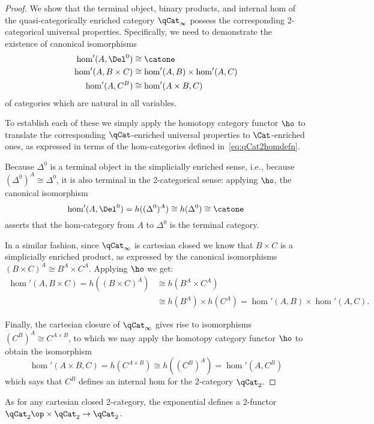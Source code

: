 \begin{proof}
We show that the terminal object, binary products, and internal hom of the quasi-categorically enriched category $\qCat_\infty$ possess the corresponding 2-categorical universal properties. Specifically, we need to demonstrate the existence of canonical isomorphisms
\begin{align*}
  \hom'(A, \Del^0) &\cong \catone \\
  \hom'(A, B\times C) &\cong \hom'(A, B)\times\hom'(A,C) \\
  \hom'(A, C^B) &\cong \hom'(A\times B, C)
\end{align*}
of categories which are natural in all variables.

To establish each of these we simply apply the homotopy category functor $\ho$ to translate the corresponding $\qCat$-enriched universal properties to $\Cat$-enriched ones, as expressed in terms of the hom-categories defined in~\eqref{eq:qCat2homdefn}. 

Because $\Delta^0$ is a terminal object in the simplicially enriched sense, i.e., because $(\Delta^0)^A \cong \Delta^0$, it is also terminal in the 2-categorical sense: applying $\ho$, the canonical isomorphism
  \[
    \hom'(A,\Del^0) = h( (\Delta^0)^A) \cong h( \Delta^0) \cong \catone
  \] 
 asserts that the hom-category from $A$ to $\Delta^0$ is the terminal category. 

  In a similar fashion, since $\qCat_\infty$ is cartesian closed we know that $B \times C$ is a simplicially enriched product, as expressed by the canonical isomorphisms $(B \times C)^A \cong B^A \times C^A$. Applying $\ho$ we get:
\begin{align*}
    \hom'(A, B\times C) = h((B \times C)^A) & \cong h(B^A \times C^A) \\
    &\cong h(B^A) \times h(C^A) = \hom'(A,B)\times\hom'(A,C).
\end{align*} 

  Finally, the cartesian closure of $\qCat_\infty$  gives rise to isomorphisms $(C^B)^A\cong C^{A \times B}$, to which we may apply the homotopy category functor $\ho$ to obtain the isomorphism 
  \[ 
    \hom'(A\times B, C) = h(C^{A \times B}) \cong h((C^B)^A) = \hom'(A,C^B)
  \] 
  which says that $C^B$ defines an internal hom for the 2-category $\qCat_2$.
\end{proof}

As for any cartesian closed 2-category, the exponential defines a 2-functor $\qCat_2\op \times \qCat_2 \to \qCat_2$.


